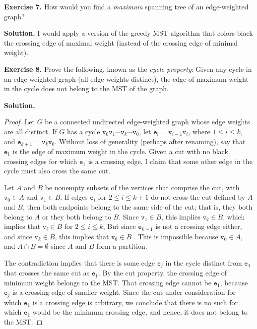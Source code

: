 \documentclass[12pt, a4paper]{article}
\newenvironment{ex}[2][Exercise]
{\par\medskip\noindent \textbf{#1 #2.}}
{\medskip}
\newenvironment{sol}[1][Solution]
{\par\medskip\noindent \textbf{#1.} }
{\medskip}
\begin{document}
	\begin{ex}{7}
		How would you find a \emph{maximum} spanning tree of an edge-weighted graph?
	\end{ex}
	\begin{sol}
		I would apply a version of the greedy MST algorithm that colors black the
		crossing edge of maximal weight (instead of the crossing edge of minimal weight).
	\end{sol}
	\begin{ex}{8}
		Prove the following, known as the \emph{cycle property}: Given any cycle in an
		edge-weighted graph (all edge weights distinct), the edge of maximum weight in
		the cycle does not belong to the MST of the graph.
	\end{ex}
	\begin{sol}
		\begin{proof}
			Let $G$ be a connected undirected edge-weighted graph whose edge weights are
			all distinct. If $G$ has a cycle $\texttt{v}_0\texttt{v}_1\cdots \texttt{v}_k\cdots \texttt{v}_0$,
			let $\texttt{e}_i=\texttt{v}_{i-1}\texttt{v}_{i}$, where $1\leq i\leq k$,
			and $\texttt{e}_{k+1}=\texttt{v}_k\texttt{v}_0$. Without
			loss of generality (perhaps after renaming), say that $\texttt{e}_1$ is the
			edge of maximum weight in the cycle. Given a cut with no black crossing edges
			for which $\texttt{e}_1$ is a crossing edge, I claim that some other edge
			in the cycle must also cross the same cut.
			
			Let $A$ and $B$ be nonempty subsets of the vertices that comprise the cut,
			with $\texttt{v}_0\in A$ and $\texttt{v}_1\in B$. If edges $\texttt{e}_i$
			for $2\leq i\leq {k+1}$ do not cross the cut defined by $A$ and $B$, then
			both endpoints belong to the same side of the cut; that is, they both belong
			to $A$ or they both belong to $B$. Since $\texttt{v}_1\in B$, this implies
			$\texttt{v}_2\in B$, which implies that $\texttt{v}_{i}\in B$ for $2\leq i\leq k$,
			But since $\texttt{e}_{k+1}$ is not a crossing edge either, and since
			$\texttt{v}_k\in B$, this implies that $\texttt{v}_0\in B$ . This is impossible
			because $\texttt{v}_0\in A$, and $A\cap B=\emptyset$ since $A$ and $B$ form
			a partition.
			
			The contradiction implies that there is some edge $\texttt{e}_j$ in the cycle
			distinct from $\texttt{e}_1$ that crosses the same cut as $\texttt{e}_1$.
			By the cut property, the crossing edge of minimum weight belongs to the
			MST. That crossing edge cannot be $\texttt{e}_1$, because $\texttt{e}_j$
			is a crossing edge of smaller weight. Since the cut under consideration
			for which $\texttt{e}_1$ is a crossing edge is arbitrary, we conclude
			that there is no such for which $\texttt{e}_1$ would be the minimum crossing
			edge, and hence, it does not belong to the MST.
		\end{proof}
	\end{sol}
\end{document}

